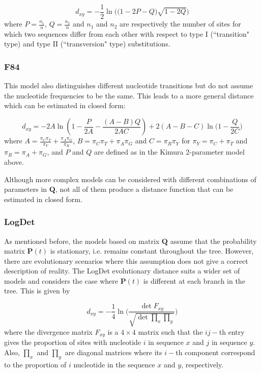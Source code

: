 \begin{equation}
d_{xy} = -\frac{1}{2}\ln\bigg( \big(1-2P-Q\big) \sqrt{1-2Q} \bigg)
\end{equation}
where $P=\frac{n_1}{n}$, $Q=\frac{n_2}{n}$ and $n_1$ and $n_2$ are respectively the number of sites for which two sequences differ from each other with respect to type I (``transition" type) and type II (``transversion" type) substitutions.

\subsubsection{F84}\label{F84_model}

This model \cite{F84} also distinguishes different nucleotide transitions but do not assume the nucleotide frequencies to be the same. This leads to a more general distance which can be estimated in closed form:

\begin{equation}
    d_{xy} = -2 A\ln\left( 1- \frac{P}{2A} - \frac{(A-B)Q}{2AC} \right) + 2(A-B-C)\ln\bigg( 1-\frac{Q}{2C} \bigg)
\label{eq:F84_distance}
\end{equation}
where $A = \frac{\pi_C \pi_T}{\pi_Y} + \frac{\pi_A \pi_G}{\pi_R}$, $B=\pi_C\pi_T + \pi_A\pi_G$ and $C=\pi_R\pi_Y$ for $\pi_Y = \pi_C + \pi_T$ and $\pi_R = \pi_A + \pi_G$, and $P$ and $Q$ are defined as in the Kimura 2-parameter model above.

Although more complex models can be considered with different combinations of parameters in $\mathbf{Q}$, not all of them produce a distance function that can be estimated in closed form. 

\subsubsection{LogDet}\label{LD_model}

As mentioned before, the models based on matrix $\mathbf{Q}$ assume that the probability matrix $\mathbf{P}(t)$ is stationary, i.e. remains constant throughout the tree. However, there are evolutionary scenarios where this assumption does not give a correct description of reality. The LogDet evolutionary distance \cite{L94} suits a wider set of models and considers the case where $\mathbf{P}(t)$ is different at each branch in the tree. This is given by

\begin{equation}
    d_{xy} = -\frac{1}{4}\ln\Bigg( \frac{\det F_{xy}}{\sqrt{\det \prod_x \prod_y}} \Bigg)
\label{eq:LogDet_distance}
\end{equation}
where the divergence matrix $F_{xy}$ is a $4\times 4$ matrix such that the $ij-$th entry gives the proportion of sites with nucleotide $i$ in sequence $x$ and $j$ in sequence $y$. Also, $\prod_x$ and $\prod_y$ are diagonal matrices where its $i-$th component correspond to the proportion of $i$ nucleotide in the sequence $x$ and $y$, respectively.


